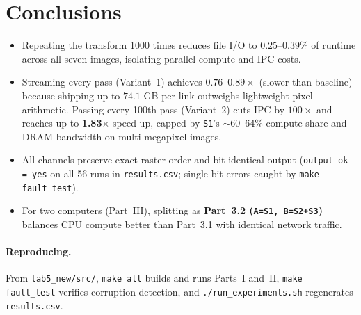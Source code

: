 \documentclass[10pt,a4paper]{article}
\begin{document}
\section{Conclusions}

\begin{itemize}
    \item Repeating the transform 1000 times reduces file I/O to $0.25\text{--}0.39\%$ of runtime across all seven images, isolating parallel compute and IPC costs.
    \item Streaming every pass (Variant~1) achieves $0.76\text{--}0.89\times$ (slower than baseline) because shipping up to $74.1\text{ GB}$ per link outweighs lightweight pixel arithmetic. Passing every 100th pass (Variant~2) cuts IPC by $100\times$ and reaches up to \textbf{1.83$\times$} speed-up, capped by \texttt{S1}'s $\sim 60\text{--}64\%$ compute share and DRAM bandwidth on multi-megapixel images.
    \item All channels preserve exact raster order and bit-identical output (\texttt{output\_ok = yes} on all 56 runs in \texttt{results.csv}; single-bit errors caught by \texttt{make fault\_test}).
    \item For two computers (Part~III), splitting as \textbf{Part~3.2 (\texttt{A=S1, B=S2+S3})} balances CPU compute better than Part~3.1 with identical network traffic.
\end{itemize}

\paragraph{Reproducing.} From \texttt{lab5\_new/src/}, \texttt{make all} builds and runs Parts~I and~II, \texttt{make fault\_test} verifies corruption detection, and \texttt{./run\_experiments.sh} regenerates \texttt{results.csv}.
\end{document}
